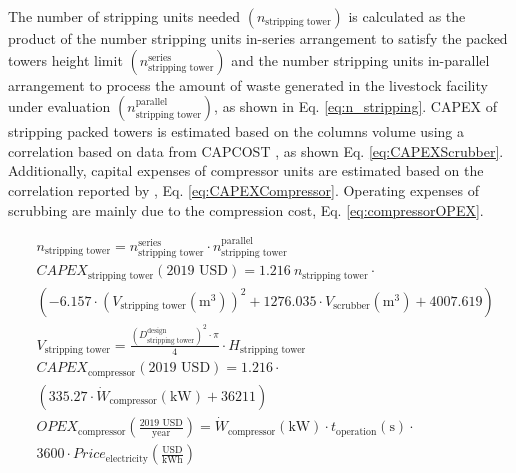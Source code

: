 \begin{refsection}[referencesCh6]

The number of stripping units needed $\left( n_{\text{stripping tower}} \right) $ is calculated as the product of the number stripping units in-series arrangement to satisfy the packed towers height limit $\left(n_{\text{stripping tower}}^{\text{series}} \right) $ and the number stripping units in-parallel arrangement to process the amount of waste generated in the livestock facility under evaluation $\left( n_{\text{stripping tower}}^{\text{parallel}} \right) $, as shown in Eq. \ref{eq:n_stripping}. CAPEX of stripping packed towers is estimated based on the columns volume using a correlation based on data from CAPCOST \citep{CAPCOST}, as shown Eq. \ref{eq:CAPEXScrubber}. Additionally, capital expenses of compressor units are estimated based on the correlation reported by \citet{almena2016technoeconomic}, Eq. \ref{eq:CAPEXCompressor}. Operating expenses of scrubbing are mainly due to the compression cost, Eq. \ref{eq:compressorOPEX}.

\begin{align}
	& n_{\text{stripping tower}} = n_{\text{stripping tower}}^{\text{series}} \cdot  n_{\text{stripping tower}}^{\text{parallel}} \label{eq:n_stripping} \\
	& CAPEX_{\text{stripping tower}} \left(\text{2019 USD}\right) = 1.216 \ n_{\text{stripping tower}} \cdot  \nonumber
	\\
	& \left(-6.157 \cdot \left(V_{\text{stripping tower}} \left(\text{m}^3\right)\right)^2 + 1276.035 \cdot V_{\text{scrubber}} \left(\text{m}^3\right) + 4007.619\right) \label{eq:CAPEXScrubber}
	\\
	& V_{\text{stripping tower}} = \frac{\left(D_{\text{stripping tower}}^{\text{design}}\right)^2 \cdot \pi}{4} \cdot H_{\text{stripping tower}} 
	\\
	&
	CAPEX_{\text{compressor}} \left(\text{2019 USD}\right) = 1.216 \cdot \nonumber \\
	& \left(335.27 \cdot \dot{W}_{\text{compressor}} \left(\text{kW}\right) + 36211\right) \label{eq:CAPEXCompressor}
	\\
	& OPEX_{\text{compressor}} \left(\frac{\text{2019 USD}}{\text{year}}\right) = \dot{W}_{\text{compressor}} \left(\text{kW}\right) \cdot t_{\text{operation}} \left(\text{s}\right) \cdot \nonumber \\
	& 3600 \cdot Price_{\text{electricity}}\left(\frac{\text{USD}}{\text{kWh}}\right) \label{eq:compressorOPEX}
\end{align}	


\end{refsection}
